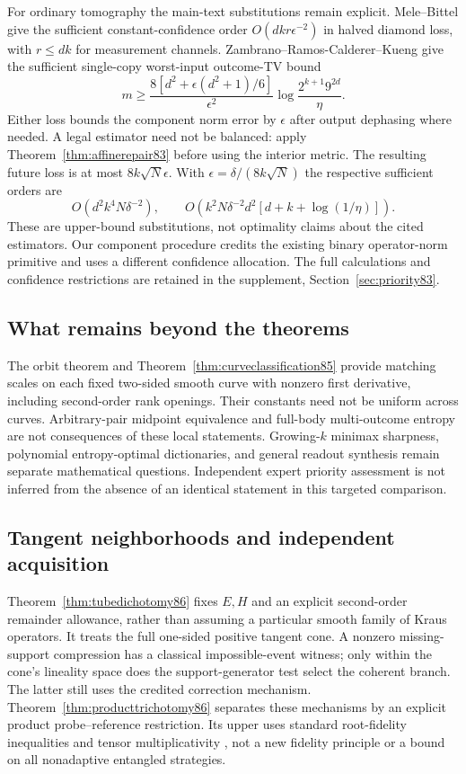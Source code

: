 For ordinary tomography the main-text substitutions remain explicit.
Mele--Bittel \cite[Theorem~III.3]{MB67} give the sufficient
constant-confidence order $O(dkr\epsilon^{-2})$ in halved diamond
loss, with $r\le dk$ for measurement channels.
Zambrano--Ramos-Calderer--Kueng \cite[Theorem~2]{ZRK76} give the
sufficient single-copy worst-input outcome-TV bound
\[
 m\ge\frac{8[d^2+\epsilon(d^2+1)/6]}{\epsilon^2}
          \log\frac{2^{k+1}9^{2d}}{\eta}.
\]
Either loss bounds the component norm error by $\epsilon$ after
output dephasing where needed.  A legal estimator need not be
balanced: apply Theorem~\ref{thm:affinerepair83} before using the
interior metric.  The resulting future loss is at most
$8k\sqrt N\epsilon$.  With $\epsilon=\delta/(8k\sqrt N)$ the
respective sufficient orders are
\[
 O(d^2k^4N\delta^{-2}),\qquad
 O\!\left(k^2N\delta^{-2}d^2[d+k+\log(1/\eta)]\right).
\]
These are upper-bound substitutions, not optimality claims about
the cited estimators.  Our component procedure credits the existing
binary operator-norm primitive and uses a different confidence
allocation.  The full calculations and confidence restrictions
are retained in the supplement, Section~\ref{sec:priority83}.

\subsection{What remains beyond the theorems}
The orbit theorem and Theorem~\ref{thm:curveclassification85} provide
matching scales on each fixed two-sided smooth curve with nonzero
first derivative, including second-order rank openings.  Their
constants need not be uniform across curves.  Arbitrary-pair
midpoint equivalence and full-body multi-outcome entropy are not
consequences of these local statements.  Growing-$k$ minimax sharpness,
polynomial entropy-optimal dictionaries, and general readout synthesis
remain separate mathematical questions.  Independent expert priority
assessment is not inferred from the absence of an identical statement
in this targeted comparison.

\subsection{Tangent neighborhoods and independent acquisition}
Theorem~\ref{thm:tubedichotomy86} fixes $E,H$ and an explicit
second-order remainder allowance, rather than assuming a particular
smooth family of Kraus operators.  It treats the full one-sided
positive tangent cone.  A nonzero missing-support compression has a
classical impossible-event witness; only within the cone's lineality
space does the support-generator test select the coherent branch.
The latter still uses the credited correction mechanism.
Theorem~\ref{thm:producttrichotomy86} separates these mechanisms by
an explicit product probe--reference restriction.  Its upper uses
standard root-fidelity inequalities and tensor multiplicativity
\cite[Chapter~3]{Watrous65}, not a new fidelity principle or a bound
on all nonadaptive entangled strategies.

